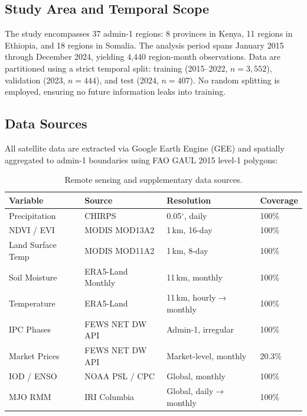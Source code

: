 \documentclass[11pt,letterpaper]{article}
\begin{document}
\subsection{Study Area and Temporal Scope}

The study encompasses 37 admin-1 regions: 8 provinces in Kenya, 11 regions in Ethiopia, and 18 regions in Somalia. The analysis period spans January 2015 through December 2024, yielding 4,440 region-month observations. Data are partitioned using a strict temporal split: training (2015--2022, $n = 3{,}552$), validation (2023, $n = 444$), and test (2024, $n = 407$). No random splitting is employed, ensuring no future information leaks into training.

\subsection{Data Sources}

All satellite data are extracted via Google Earth Engine (GEE) and spatially aggregated to admin-1 boundaries using FAO GAUL 2015 level-1 polygons:

\begin{table}[H]
\centering
\caption{Remote sensing and supplementary data sources.}
\label{tab:data}
\begin{tabular}{llll}
\toprule
\textbf{Variable} & \textbf{Source} & \textbf{Resolution} & \textbf{Coverage} \\
\midrule
Precipitation     & CHIRPS          & 0.05$^\circ$, daily       & 100\% \\
NDVI / EVI        & MODIS MOD13A2   & 1\,km, 16-day             & 100\% \\
Land Surface Temp & MODIS MOD11A2   & 1\,km, 8-day              & 100\% \\
Soil Moisture     & ERA5-Land Monthly & 11\,km, monthly         & 100\% \\
Temperature       & ERA5-Land       & 11\,km, hourly$\to$monthly & 100\% \\
IPC Phases        & FEWS NET DW API & Admin-1, irregular         & 100\% \\
Market Prices     & FEWS NET DW API & Market-level, monthly      & 20.3\% \\
IOD / ENSO        & NOAA PSL / CPC  & Global, monthly            & 100\% \\
MJO RMM           & IRI Columbia    & Global, daily$\to$monthly  & 100\% \\
\bottomrule
\end{tabular}
\end{table}
\end{document}
